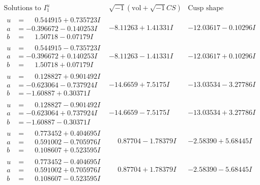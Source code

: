 \documentclass[1p]{elsarticle_modified}
\theoremstyle{definition}
\newcommand{\I}{\sqrt{-1}}
\begin{document}
$$\begin{array}{c|c|c}  
\text{Solutions to }I^u_{1}& \I (\text{vol} + \sqrt{-1}CS) & \text{Cusp shape}\\
 \hline 
\begin{aligned}
u &= \phantom{-}0.544915 + 0.735723 I \\
a &= -0.396672 - 0.140253 I \\
b &= \phantom{-}1.50718 - 0.07179 I\end{aligned}
 & -8.11263 + 1.41331 I & -12.03617 - 0.10296 I \\ \hline\begin{aligned}
u &= \phantom{-}0.544915 - 0.735723 I \\
a &= -0.396672 + 0.140253 I \\
b &= \phantom{-}1.50718 + 0.07179 I\end{aligned}
 & -8.11263 - 1.41331 I & -12.03617 + 0.10296 I \\ \hline\begin{aligned}
u &= \phantom{-}0.128827 + 0.901492 I \\
a &= -0.623064 - 0.737924 I \\
b &= -1.60887 + 0.30371 I\end{aligned}
 & -14.6659 + 7.5175 I & -13.03534 - 3.27786 I \\ \hline\begin{aligned}
u &= \phantom{-}0.128827 - 0.901492 I \\
a &= -0.623064 + 0.737924 I \\
b &= -1.60887 - 0.30371 I\end{aligned}
 & -14.6659 - 7.5175 I & -13.03534 + 3.27786 I \\ \hline\begin{aligned}
u &= \phantom{-}0.773452 + 0.404695 I \\
a &= \phantom{-}0.591002 - 0.705976 I \\
b &= \phantom{-}0.108607 + 0.523595 I\end{aligned}
 & \phantom{-}0.87704 - 1.78379 I & -2.58390 + 5.68445 I \\ \hline\begin{aligned}
u &= \phantom{-}0.773452 - 0.404695 I \\
a &= \phantom{-}0.591002 + 0.705976 I \\
b &= \phantom{-}0.108607 - 0.523595 I\end{aligned}
 & \phantom{-}0.87704 + 1.78379 I & -2.58390 - 5.68445 I \\ \hline\begin{aligned}

\end{aligned}
\end{array}$$
\end{document}
